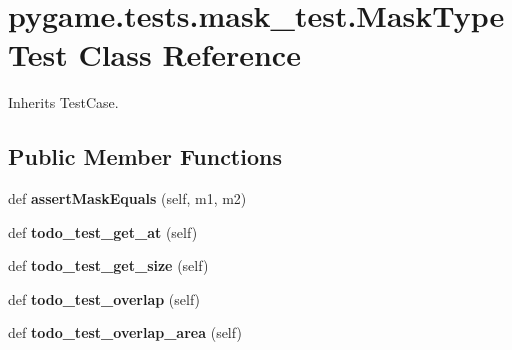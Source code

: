 \hypertarget{classpygame_1_1tests_1_1mask__test_1_1_mask_type_test}{}\section{pygame.\+tests.\+mask\+\_\+test.\+Mask\+Type\+Test Class Reference}
\label{classpygame_1_1tests_1_1mask__test_1_1_mask_type_test}


Inherits Test\+Case.

\subsection*{Public Member Functions}
\begin{DoxyCompactItemize}
\item 
\mbox{\label{classpygame_1_1tests_1_1mask__test_1_1_mask_type_test_a5adb652340075d98b4104733b625fca0}} 
def {\bfseries assert\+Mask\+Equals} (self, m1, m2)
\item 
\mbox{\label{classpygame_1_1tests_1_1mask__test_1_1_mask_type_test_acb1dd7da2de703fc73672b39576b1ad4}} 
def {\bfseries todo\+\_\+test\+\_\+get\+\_\+at} (self)
\item 
\mbox{\label{classpygame_1_1tests_1_1mask__test_1_1_mask_type_test_a8b914a2a9649fd3541114fd51f2f8782}} 
def {\bfseries todo\+\_\+test\+\_\+get\+\_\+size} (self)
\item 
\mbox{\label{classpygame_1_1tests_1_1mask__test_1_1_mask_type_test_aa61bf4ee868293a5e0ba4ecc027939ef}} 
def {\bfseries todo\+\_\+test\+\_\+overlap} (self)
\item 
\mbox{\label{classpygame_1_1tests_1_1mask__test_1_1_mask_type_test_a2789dbae7a4a0d347f0a866b55d31965}} 
def {\bfseries todo\+\_\+test\+\_\+overlap\+\_\+area} (self)
\item 
\mbox{\label{classpygame_1_1tests_1_1mask__test_1_1_mask_type_test_af6786a54f60b2e481141312f7a342f0d}} 

\end{DoxyCompactItemize}
